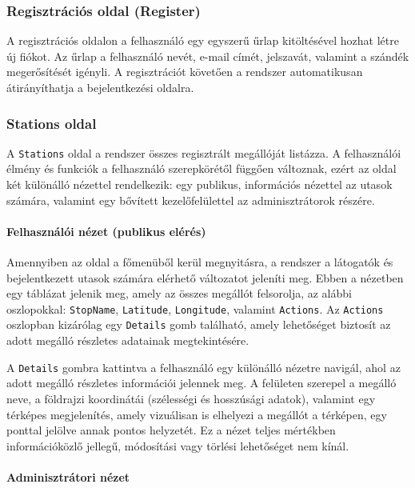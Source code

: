 \subsubsection{Regisztrációs oldal (Register)}

A regisztrációs oldalon a felhasználó egy egyszerű űrlap kitöltésével hozhat létre új fiókot. Az űrlap a felhasználó nevét, e-mail címét, jelszavát, valamint a szándék megerősítését igényli. A regisztrációt követően a rendszer automatikusan átirányíthatja a bejelentkezési oldalra.

\subsubsection{Stations oldal}

A \texttt{Stations} oldal a rendszer összes regisztrált megállóját listázza. A felhasználói élmény és funkciók a felhasználó szerepkörétől függően változnak, ezért az oldal két különálló nézettel rendelkezik: egy publikus, információs nézettel az utasok számára, valamint egy bővített kezelőfelülettel az adminisztrátorok részére.

\paragraph{Felhasználói nézet (publikus elérés)}

Amennyiben az oldal a főmenüből kerül megnyitásra, a rendszer a látogatók és bejelentkezett utasok számára elérhető változatot jeleníti meg. Ebben a nézetben egy táblázat jelenik meg, amely az összes megállót felsorolja, az alábbi oszlopokkal: \texttt{StopName}, \texttt{Latitude}, \texttt{Longitude}, valamint \texttt{Actions}. Az \texttt{Actions} oszlopban kizárólag egy \texttt{Details} gomb található, amely lehetőséget biztosít az adott megálló részletes adatainak megtekintésére.

A \texttt{Details} gombra kattintva a felhasználó egy különálló nézetre navigál, ahol az adott megálló részletes információi jelennek meg. A felületen szerepel a megálló neve, a földrajzi koordinátái (szélességi és hosszúsági adatok), valamint egy térképes megjelenítés, amely vizuálisan is elhelyezi a megállót a térképen, egy ponttal jelölve annak pontos helyzetét. Ez a nézet teljes mértékben információközlő jellegű, módosítási vagy törlési lehetőséget nem kínál.

\paragraph{Adminisztrátori nézet}

